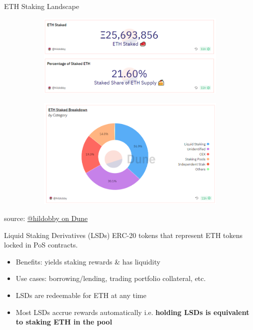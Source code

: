 \documentclass{beamer}
\begin{document}
\begin{frame}{ETH Staking Landscape}
    \begin{figure}
        \centering
        \begin{subfigure}[b]{0.45\textwidth}
            \centering
            \includegraphics[width=\textwidth]{figures/eth_stake_stats.png}
        \end{subfigure}
        \begin{subfigure}[b]{0.45\textwidth}
            \centering
            \includegraphics[width=\textwidth]{figures/eth_stake_breakdown.png}
        \end{subfigure}
    \end{figure}
    \tiny{source: \href{https://dune.com/hildobby/eth2-staking}{@hildobby on Dune}}

\end{frame}

\begin{frame}{Liquid Staking Derivatives (LSDs)}
    ERC-20 tokens that represent ETH tokens locked in PoS contracts. 
    \begin{itemize}
        \item Benefits: yields staking rewards \& has liquidity
        \item Use cases: borrowing/lending, trading portfolio collateral, etc.
        \item LSDs are redeemable for ETH at any time
        \item Most LSDs accrue rewards automatically i.e. \textbf{holding LSDs is equivalent to staking ETH in the pool}
    \end{itemize}
    \bigskip
    
\end{frame}
\end{document}
